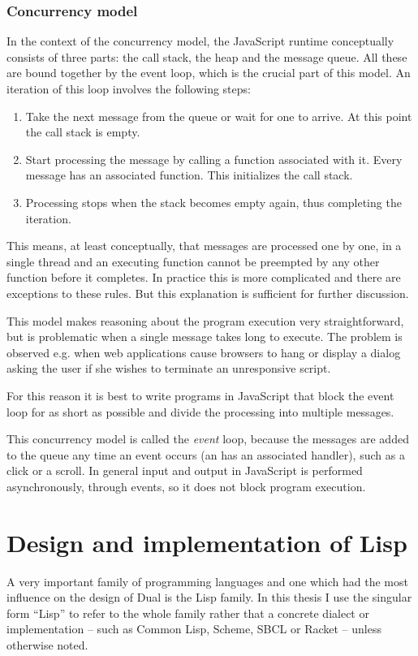 \subsubsection{Concurrency model}
In the context of the concurrency model, the JavaScript runtime conceptually
consists of three parts: the call stack, the heap and the message queue. All
these are bound together by the event loop\cite{mdn_concurrency}, which is the crucial part of this model.  An iteration of this loop involves the following steps:
\begin{enumerate}
	\item Take the next message from the queue or wait for one to arrive. At
          this point the call stack is empty.
	\item Start processing the message by calling a function associated with
          it. Every message has an associated function. This initializes the
          call stack.
	\item Processing stops when the stack becomes empty again, thus
          completing the iteration.
\end{enumerate}

This means, at least conceptually, that messages are processed one by one, in a single thread and an executing function cannot be preempted by any other function before it completes. In practice this is more complicated and there are exceptions to these rules. But this explanation is sufficient for further discussion.

This model makes reasoning about the program execution very straightforward, but
is problematic when a single message takes long to execute. The problem is
observed e.g. when web applications cause browsers to hang or display a
dialog asking the user if she wishes to terminate an unresponsive script.

For this reason it is best to write programs in JavaScript that block the event
loop for as short as possible and divide the processing into multiple messages.

This concurrency model is called the \textit{event} loop, because the messages are added to the queue any time an event occurs (an has an associated handler), such as a click or a scroll. In general input and output in JavaScript is performed asynchronously, through events, so it does not block program execution.

\section{Design and implementation of Lisp}\label{sec:lisp}
A very important family of programming languages and one which had the most
influence on the design of Dual is the Lisp family. In this thesis I use the
singular form ``Lisp'' to refer to the whole family rather that a concrete
dialect or implementation -- such as Common Lisp\cite{common_lisp_hyperspec}, Scheme\cite{r7rs}, SBCL\cite{sbcl_site} or Racket\cite{racket_site} -- unless otherwise noted.

